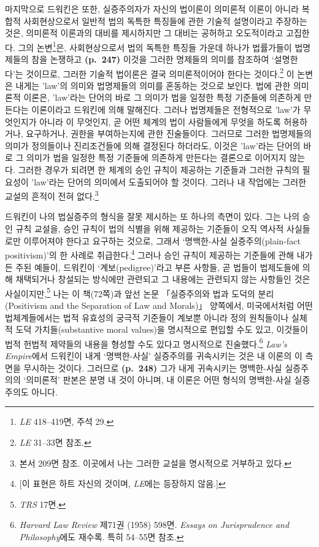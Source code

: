 마지막으로 드워킨은 또한, 실증주의자가 자신의 법이론이 의미론적 이론이
아니라 복합적 사회현상으로서 일반적 법의 독특한 특징들에 관한 기술적
설명이라고 주장하는 것은, 의미론적 이론과의 대비를 제시하지만 그 대비는
공허하고 오도적이라고 고집한다. 그의 논변\footnote{\emph{LE} 418--419면,
  주석 29.}은, 사회현상으로서 법의 독특한 특징들 가운데 하나가
법률가들이 법명제들의 참을 논쟁하고 \textbf{(p.~247)} 이것을 그러한
명제들의 의미를 참조하여 ‘설명한다’는 것이므로, 그러한 기술적 법이론은
결국 의미론적이어야 한다는 것이다.\footnote{\emph{LE} 31--33면 참조.} 이
논변은 내게는 'law'의 의미와 법명제들의 의미를 혼동하는 것으로 보인다.
법에 관한 의미론적 이론은, 'law'라는 단어의 바로 그 의미가 법을 일정한
특정 기준들에 의존하게 만든다는 이론이라고 드워킨에 의해 말해진다.
그러나 법명제들은 전형적으로 'law'가 무엇인지가 아니라 이 무엇인지, 곧 어떤 체계의 법이 사람들에게 무엇을 하도록
허용하거나, 요구하거나, 권한을 부여하는지에 관한 진술들이다. 그러므로
그러한 법명제들의 의미가 정의들이나 진리조건들에 의해 결정된다 하더라도,
이것은 'law'라는 단어의 바로 그 의미가 법을 일정한 특정 기준들에
의존하게 만든다는 결론으로 이어지지 않는다. 그러한 경우가 되려면 한
체계의 승인 규칙이 제공하는 기준들과 그러한 규칙의 필요성이 'law'라는
단어의 의미에서 도출되어야 할 것이다. 그러나 내 작업에는 그러한 교설의
흔적이 전혀 없다.\footnote{본서 209면 참조. 이곳에서 나는 그러한 교설을
  명시적으로 거부하고 있다.}

드워킨이 나의 법실증주의 형식을 잘못 제시하는 또 하나의 측면이 있다.
그는 나의 승인 규칙 교설을, 승인 규칙이 법의 식별을 위해 제공하는
기준들이 오직 역사적 사실들로만 이루어져야 한다고 요구하는 것으로,
그래서 ‘명백한-사실 실증주의(plain-fact positivism)’의 한 사례로
취급한다.\footnote{{[}이 표현은 하트 자신의 것이며, \emph{LE}에는
  등장하지 않음.{]}} 그러나 승인 규칙이 제공하는 기준들에 관해 내가 든
주된 예들이, 드워킨이 ‘계보(pedigree)’라고 부른 사항들, 곧 법들이
법제도들에 의해 채택되거나 창설되는 방식에만 관련되고 그 내용에는
관련되지 않는 사항들인 것은 사실이지만,\footnote{\emph{TRS} 17면.} 나는
이 책(72쪽)과 앞선 논문 「실증주의와 법과 도덕의 분리(Positivism and the
Separation of Law and Morals)」 양쪽에서, 미국에서처럼 어떤
법체계들에서는 법적 유효성의 궁극적 기준들이 계보뿐 아니라 정의
원칙들이나 실체적 도덕 가치들(substantive moral values)을 명시적으로
편입할 수도 있고, 이것들이 법적 헌법적 제약들의 내용을 형성할 수도
있다고 명시적으로 진술했다.\footnote{\emph{Harvard Law Review} 제71권
  (1958) 598면. \emph{Essays on Jurisprudence and Philosophy}에도
  재수록. 특히 54--55면 참조.} \emph{Law's Empire}에서 드워킨이 내게
‘명백한-사실’ 실증주의를 귀속시키는 것은 내 이론의 이 측면을 무시하는
것이다. 그러므로 \textbf{(p.~248)} 그가 내게 귀속시키는 명백한-사실
실증주의의 ‘의미론적’ 판본은 분명 내 것이 아니며, 내 이론은 어떤 형식의
명백한-사실 실증주의도 아니다.


